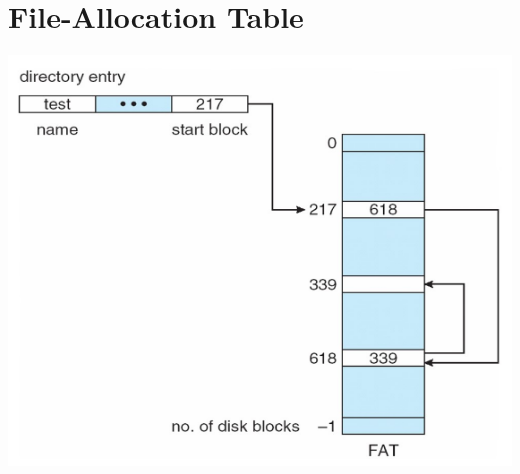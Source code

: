 \documentclass{article}[18pt]
\begin{document}
\section{File-Allocation Table}
\begin{center}
	\includegraphics[scale=0.7]{FAT}
\end{center}
\end{document}
